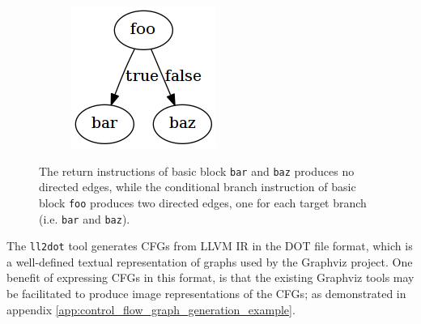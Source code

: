 \begin{figure}[htbp]
	\centering
	\begin{subfigure}[ht]{0.54\textwidth}
		
	\end{subfigure}
	\enskip
	\begin{subfigure}[ht]{0.22\textwidth}
		\includegraphics[width=\textwidth]{inc/cfg_gen_example.png}
	\end{subfigure}
	\caption{The return instructions of basic block \texttt{bar} and \texttt{baz} produces no directed edges, while the conditional branch instruction of basic block \texttt{foo} produces two directed edges, one for each target branch (i.e. \texttt{bar} and \texttt{baz}).}
	\label{fig:cfg_gen_example}
\end{figure}


The \texttt{ll2dot} tool generates CFGs from LLVM IR in the DOT file format, which is a well-defined textual representation of graphs used by the Graphviz project. One benefit of expressing CFGs in this format, is that the existing Graphviz tools may be facilitated to produce image representations of the CFGs; as demonstrated in appendix \ref{app:control_flow_graph_generation_example}.
